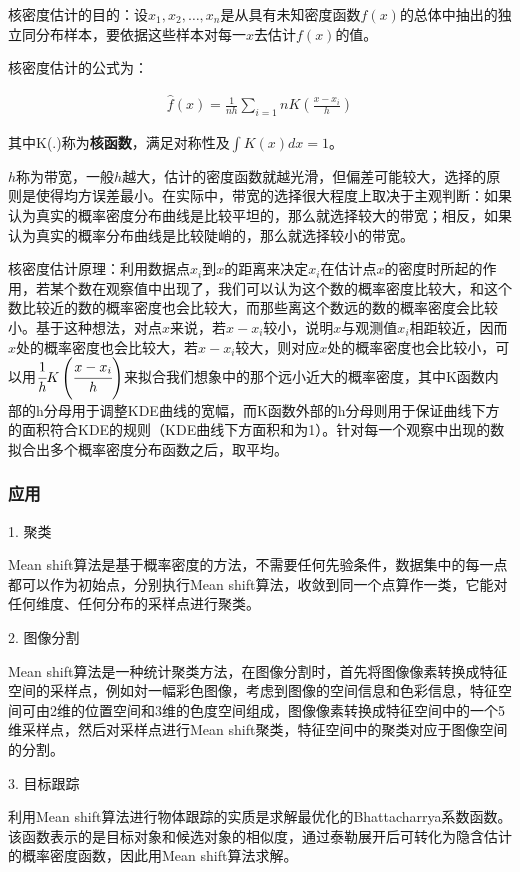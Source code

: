 \documentclass[12pt]{article}
\begin{document}
核密度估计的目的：设$x_1, x_2, \ldots, x_n$是从具有未知密度函数$f(x)$的总体中抽出的独立同分布样本，要依据这些样本对每一$x$去估计$f(x)$的值。

核密度估计的公式为：

\begin{align}
\hat{f}(x) = \frac{1}{nh}\sum_{i=1}{n}K(\frac{x-x_i}{h})
\end{align}

其中K(.)称为\textbf{核函数}，满足对称性及$\int K(x)dx=1$。

$h$称为带宽，一般$h$越大，估计的密度函数就越光滑，但偏差可能较大，选择的原则是使得均方误差最小。在实际中，带宽的选择很大程度上取决于主观判断：如果认为真实的概率密度分布曲线是比较平坦的，那么就选择较大的带宽；相反，如果认为真实的概率分布曲线是比较陡峭的，那么就选择较小的带宽。

核密度估计原理：利用数据点$x_i$到$x$的距离来决定$x_i$在估计点$x$的密度时所起的作用，若某个数在观察值中出现了，我们可以认为这个数的概率密度比较大，和这个数比较近的数的概率密度也会比较大，而那些离这个数远的数的概率密度会比较小。基于这种想法，对点$x$来说，若$x-x_i$较小，说明$x$与观测值$x_i$相距较近，因而$x$处的概率密度也会比较大，若$x-x_i$较大，则对应$x$处的概率密度也会比较小，可以用$\cfrac{1}{h}K\left(\cfrac{x-x_i}{h}\right)$来拟合我们想象中的那个远小近大的概率密度，其中K函数内部的h分母用于调整KDE曲线的宽幅，而K函数外部的h分母则用于保证曲线下方的面积符合KDE的规则（KDE曲线下方面积和为1）。针对每一个观察中出现的数拟合出多个概率密度分布函数之后，取平均。



\subsubsection{应用}

1. 聚类

Mean shift算法是基于概率密度的方法，不需要任何先验条件，数据集中的每一点都可以作为初始点，分别执行Mean shift算法，收敛到同一个点算作一类，它能对任何维度、任何分布的采样点进行聚类。

2. 图像分割

Mean shift算法是一种统计聚类方法，在图像分割时，首先将图像像素转换成特征空间的采样点，例如対一幅彩色图像，考虑到图像的空间信息和色彩信息，特征空间可由2维的位置空间和3维的色度空间组成，图像像素转换成特征空间中的一个5维采样点，然后对采样点进行Mean shift聚类，特征空间中的聚类对应于图像空间的分割。

3. 目标跟踪

利用Mean shift算法进行物体跟踪的实质是求解最优化的Bhattacharrya系数函数\cite{fashing2005mean}。该函数表示的是目标对象和候选对象的相似度，通过泰勒展开后可转化为隐含估计的概率密度函数，因此用Mean shift算法求解。
\end{document}
